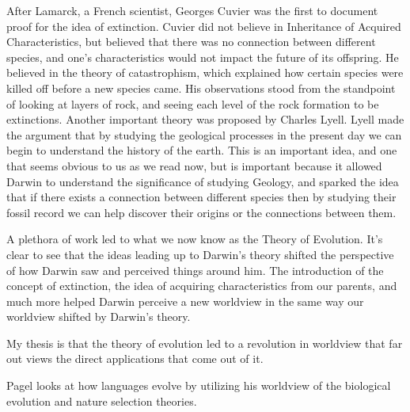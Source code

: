 \documentclass[11pt, oneside]{article}
\begin{document}
\par After Lamarck, a French scientist, Georges Cuvier was the first to document proof for the idea of extinction. Cuvier did not believe in Inheritance of Acquired Characteristics, but believed that there was no connection between different species, and one's characteristics would not impact the future of its offspring. He believed in the theory of catastrophism, which explained how certain species were killed off before a new species came. His observations stood from the standpoint of looking at layers of rock, and seeing each level of the rock formation to be extinctions. Another important theory was proposed by Charles Lyell. Lyell made the argument that by studying the geological processes in the present day we can begin to understand the history of the earth. This is an important idea, and one that seems obvious to us as we read now, but is  important because it allowed Darwin to understand the significance of studying Geology, and sparked the idea that if there exists a connection between different species then by studying their fossil record we can help discover their origins or the connections between them. 

\par A plethora of work led to what we now know as the Theory of Evolution. It's clear to see that the ideas leading up to Darwin's theory shifted the perspective of how Darwin saw and perceived things around him. The introduction of the concept of extinction, the idea of acquiring characteristics from our parents, and much more helped Darwin perceive a new worldview in the same way our worldview shifted by Darwin's theory. 



\par My thesis is that the theory of evolution led to a revolution in worldview that far out views the direct applications that come out of it. 

\par Pagel looks at how languages evolve by utilizing his worldview of the biological evolution and nature selection theories. 
\end{document}
